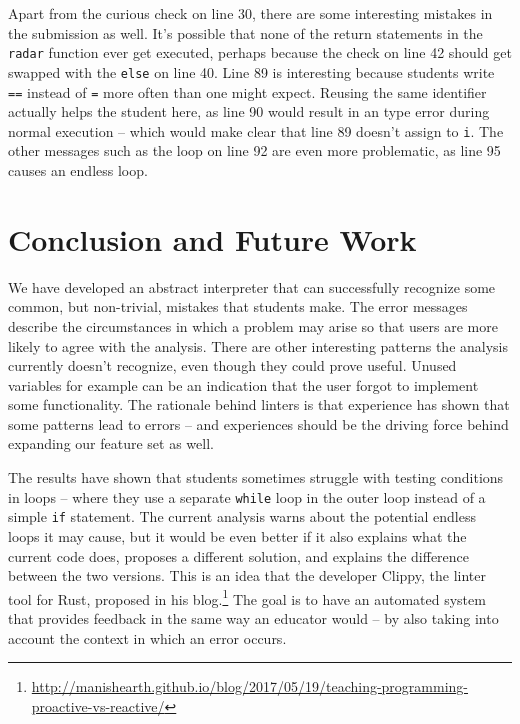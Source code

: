 \documentclass[a4paper, 16pt, oneside]{Thesis}
\begin{document}
\clearpage

Apart from the curious check on line 30, there are some interesting
mistakes in the submission as well. It's possible that none of the
return statements in the \texttt{radar} function ever get executed,
perhaps because the check on line 42 should get swapped with the
\texttt{else} on line 40. Line 89 is interesting because students write
\texttt{==} instead of \texttt{=} more often than one might expect.
Reusing the same identifier actually helps the student here, as line 90
would result in an type error during normal execution -- which would
make clear that line 89 doesn't assign to \texttt{i}. The other messages
such as the loop on line 92 are even more problematic, as line 95 causes
an endless loop.

\chapter{Conclusion and Future Work}\label{conclusion-and-future-work}

We have developed an abstract interpreter that can successfully
recognize some common, but non-trivial, mistakes that students make. The
error messages describe the circumstances in which a problem may arise
so that users are more likely to agree with the analysis. There are
other interesting patterns the analysis currently doesn't recognize,
even though they could prove useful. Unused variables for example can be
an indication that the user forgot to implement some functionality. The
rationale behind linters is that experience has shown that some patterns
lead to errors -- and experiences should be the driving force behind
expanding our feature set as well.

The results have shown that students sometimes struggle with testing
conditions in loops -- where they use a separate \texttt{while} loop in
the outer loop instead of a simple \texttt{if} statement. The current
analysis warns about the potential endless loops it may cause, but it
would be even better if it also explains what the current code does,
proposes a different solution, and explains the difference between the
two versions. This is an idea that the developer Clippy, the linter tool
for Rust, proposed in his blog.\footnote{\url{http://manishearth.github.io/blog/2017/05/19/teaching-programming-proactive-vs-reactive/}}
The goal is to have an automated system that provides feedback in the
same way an educator would -- by also taking into account the context in
which an error occurs.
\end{document}
